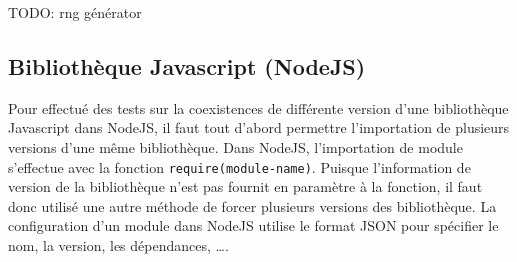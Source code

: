 \documentclass[12pt,initial,twoside,maitrise]{dms}
\newcommand\TODO[1]{\colorbox{green}{#1\rule{\linewidth}{0.5cm}}}
\numberwithin{equation}{section}
\numberwithin{table}{chapter}
\numberwithin{figure}{chapter}
\begin{document}
TODO: rng générator










\subsection{Bibliothèque Javascript (NodeJS)}

Pour effectué des tests sur la coexistences de différente version d'une bibliothèque
Javascript dans NodeJS, il faut tout d'abord permettre l'importation de plusieurs
versions d'une même bibliothèque. Dans NodeJS, l'importation de module s'effectue
avec la fonction \verb|require(module-name)|. Puisque l'information de version
de la bibliothèque n'est pas fournit en paramètre à la fonction, il faut donc
utilisé une autre méthode de forcer plusieurs versions des bibliothèque.
La configuration d'un module dans NodeJS utilise le format JSON pour spécifier
le nom, la version, les dépendances, \dots.
\end{document}
